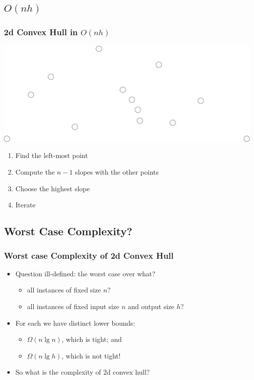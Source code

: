 \documentclass{beamer}
\begin{document}
\subsection{$O(nh)$}
\begin{frame}
  \frametitle{2d Convex Hull in $O(nh)$}
  \includegraphics[width=\textwidth]{points}
  \begin{enumerate}
  \item Find the left-most point
  \item Compute the $n-1$ slopes with the other points
  \item Choose the highest slope
  \item Iterate 
  \end{enumerate}
\end{frame}


\subsection{Worst Case Complexity?}

\begin{frame}
  \frametitle{Worst case Complexity of 2d Convex Hull}
  \begin{itemize}
  \item Question ill-defined: the worst case over what?
    \begin{itemize}
    \item all instances of fixed size $n$?
    \item all instances of fixed input size $n$ and output size $h$?
    \end{itemize}
  \item For each we have distinct lower bounds:
    \begin{itemize}
    \item $\Omega(n\lg n)$, which is tight; and
    \item $\Omega(n\lg h)$, which is \alert{not} tight!
    \end{itemize}
  \item So what is the complexity of 2d convex hull?
  \end{itemize}
\end{frame}
\end{document}
